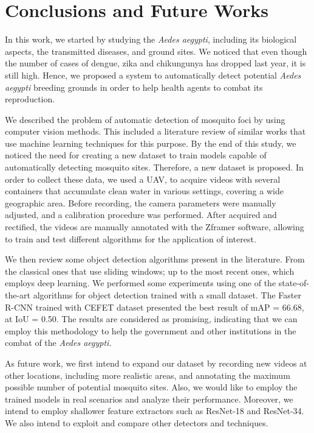 \chapter{Conclusions and Future Works}
\label{chap:conclusions}

%
In this work, we started by studying the {\it Aedes aegypti}, including its biological aspects, the transmitted diseases, and ground sites.
We noticed that even though the number of cases of dengue, zika and chikungunya has dropped last year, it is still high.
Hence, we proposed a system to automatically detect potential \textit{Aedes aegypti} breeding grounds in order to help health agents to combat its reproduction.

We described the problem of automatic detection of mosquito foci by using computer vision methods.
This included a literature review of similar works that use machine learning techniques for this purpose.
By the end of this study, we noticed the need for creating a new dataset to train models capable of automatically detecting mosquito sites.
Therefore, a new dataset is proposed.
In order to collect these data, we used a UAV, to acquire videos with several containers that accumulate clean water in various settings, covering a wide geographic area.
Before recording, the camera parameters were manually adjusted, and a calibration procedure was performed.
After acquired and rectified, the videos are manually annotated with the Zframer software, allowing to train and test different algorithms for the application of interest.

We then review some object detection algorithms present in the literature.
From the classical ones that use sliding windows; up to the most recent ones, which employs deep learning.
We performed some experiments using one of the state-of-the-art algorithms for object detection trained with a small dataset.
The Faster R-CNN trained with CEFET dataset presented the best result of mAP = 66.68, at IoU = 0.50.
The results are considered as promising, indicating that we can employ this methodology to help the government and other institutions in the combat of the {\textit{Aedes aegypti}}.


%
As future work, we first intend to expand our dataset by recording new videos at other locations, including more realistic areas, and annotating the maximum possible number of potential mosquito sites.
Also, we would like to employ the trained models in real scenarios and analyze their performance.
Moreover, we intend to employ shallower feature extractors such as ResNet-18 and ResNet-34.
We also intend to exploit and compare other detectors and techniques.

